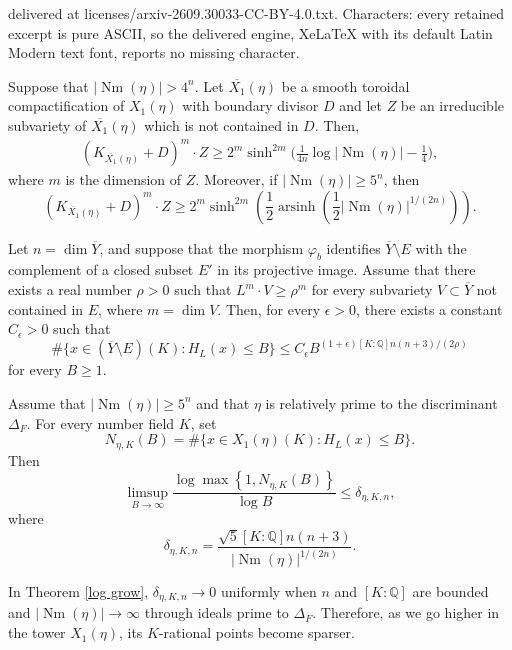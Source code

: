 \documentclass[10pt,a4paper]{amsart}
\newcommand{\Nm}{\operatorname{Nm}}
\newcommand{\Xb}{\overline{X_{1}}}
\newcommand{\bi}{\big}
\begin{document}
delivered at licenses/arxiv-2609.30033-CC-BY-4.0.txt. Characters: every retained excerpt is pure ASCII, so the delivered engine, XeLaTeX with its default Latin Modern text font, reports no missing character.
\begin{theorem}\label{log deg} Suppose that $|\Nm(\eta)|>4^n$. Let $\Xb(\eta)$ be a smooth toroidal compactification of $X_1(\eta)$ with boundary divisor $D$ and let $Z$ be an irreducible subvariety of $\Xb(\eta)$ which is not contained in $D.$ Then,
\begin{align*}
    (K_{\Xb(\eta)}+D)^m \cdot Z
    \ge
    2^m\sinh^{2m}\bi( \frac{1}{4n}\log |\Nm(\eta)|-\frac{1}{4}\bi),
\end{align*}
where $m$ is the dimension of $Z.$ Moreover, if $|\Nm(\eta)|\ge5^n$, then
\[
(K_{\Xb(\eta)}+D)^m\cdot Z
\ge2^m\sinh^{2m}\left(\frac12\operatorname{arsinh}\left(\frac12|\Nm(\eta)|^{1/(2n)}\right)\right).
\]
\end{theorem}

\begin{Lemma}\label{semiample counting}
Let \(n=\dim\overline Y\), and suppose that the morphism \(\varphi_b\) identifies \(\overline Y\setminus E\) with the complement of a closed subset \(E'\) in its projective image. Assume that there exists a real number \(\rho>0\) such that
\(L^m\cdot V\geq\rho^m\) for every subvariety \(V\subset\overline Y\) not contained in \(E\), where \(m=\dim V\). 
Then, for every \(\epsilon>0\), there exists a constant \(C_\epsilon>0\) such that
$$
\#\{x\in(\overline Y\setminus E)(K):H_L(x)\leq B\}
\leq C_\epsilon B^{(1+\epsilon)[K:\mathbb Q]n(n+3)/(2\rho)}
$$
for every \(B\geq1\).


\end{Lemma}

\begin{theorem}\label{log grow}
Assume that \(|\Nm(\eta)|\geq5^n\) and that \(\eta\) is relatively prime to the discriminant \(\Delta_F\).
For every number field \(K\), set
\[
N_{\eta,K}(B)
=\#\{x\in X_1(\eta)(K):H_L(x)\leq B\}.
\]
Then
\[
\limsup_{B\to\infty}
\frac{\log\max\left\{1,N_{\eta,K}(B)\right\}}
{\log B}
\leq \delta_{\eta,K,n},
\]
where
\[
\delta_{\eta,K,n}
=
\frac{\sqrt5[K:\mathbb Q]n(n+3)}
{|\Nm(\eta)|^{1/(2n)}}.
\]
\end{theorem}

\begin{Remark}
In Theorem \ref{log grow}, \(\delta_{\eta,K,n}\to0\) uniformly when \(n\) and
\([K:\mathbb Q]\) are bounded and
\(|\Nm(\eta)|\to\infty\) through ideals prime to \(\Delta_F\). Therefore, as we go higher in the tower \(X_1(\eta)\), its \(K\)-rational points become sparser.
\end{Remark}
\end{document}
